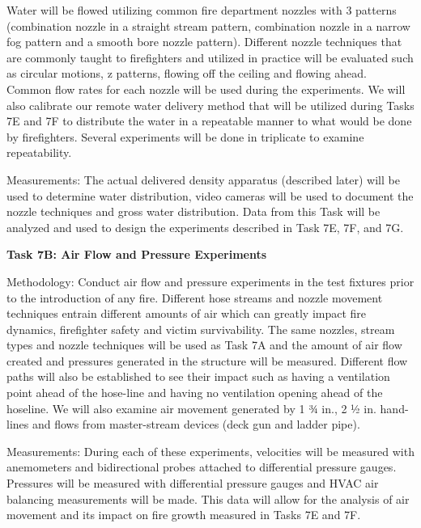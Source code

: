 \documentclass{article}
\begin{document}
\begin{itemize}
Water will be flowed utilizing common fire department nozzles with 3 patterns (combination nozzle in a straight stream pattern, combination nozzle in a narrow fog pattern and a smooth bore nozzle pattern). Different nozzle techniques that are commonly taught to firefighters and utilized in practice will be evaluated such as circular motions, z patterns, flowing off the ceiling and flowing ahead. Common flow rates for each nozzle will be used during the experiments. We will also calibrate our remote water delivery method that will be utilized during Tasks 7E and 7F to distribute the water in a repeatable manner to what would be done by firefighters. Several experiments will be done in triplicate to examine repeatability.  

Measurements: The actual delivered density apparatus (described later) will be used to determine water distribution, video cameras will be used to document the nozzle techniques and gross water distribution. Data from this Task will be analyzed and used to design the experiments described in Task 7E, 7F, and 7G.
\vspace*{\baselineskip}

\subitem \bf{Task 7B:  Air Flow and Pressure Experiments}
\normalfont
\vspace*{\baselineskip}

Methodology: Conduct air flow and pressure experiments in the test fixtures prior to the introduction of any fire. Different hose streams and nozzle movement techniques entrain different amounts of air which can greatly impact fire dynamics, firefighter safety and victim survivability. The same nozzles, stream types and nozzle techniques will be used as Task 7A and the amount of air flow created and pressures generated in the structure will be measured. Different flow paths will also be established to see their impact such as having a ventilation point ahead of the hose-line and having no ventilation opening ahead of the hoseline. We will also examine air movement generated by 1 ¾ in., 2 ½ in. hand-lines and flows from master-stream devices (deck gun and ladder pipe).

Measurements: During each of these experiments, velocities will be measured with anemometers and bidirectional probes attached to differential pressure gauges. Pressures will be measured with differential pressure gauges and HVAC air balancing measurements will be made. This data will allow for the analysis of air movement and its impact on fire growth measured in Tasks 7E and 7F.
\vspace*{\baselineskip}


\end{itemize}
\end{document}
